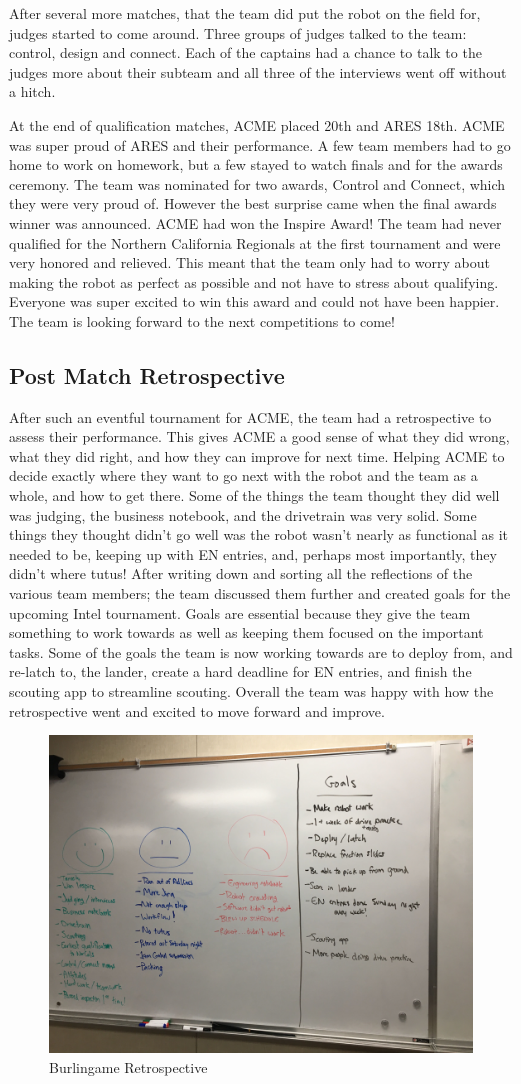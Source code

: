 \documentclass{article}
\begin{document}
After several more matches, that the team did put the robot on the field for, judges started to come around. Three groups of judges talked to the team: control, design and connect. Each of the captains had a chance to talk to the judges more about their subteam and all three of the interviews went off without a hitch. 

At the end of qualification matches, ACME placed 20th and ARES 18th. ACME was super proud of ARES and their performance. A few team members had to go home to work on homework, but a few stayed to watch finals and for the awards ceremony. The team was nominated for two awards, Control and Connect, which they were very proud of. However the best surprise came when the final awards winner was announced. ACME had won the Inspire Award! The team had never qualified for the Northern California Regionals at the first tournament and were very honored and relieved. This meant that the team only had to worry about making the robot as perfect as possible and not have to stress about qualifying. Everyone was super excited to win this award and could not have been happier. The team is looking forward to the next competitions to come!

\subsection{Post Match Retrospective}
After such an eventful tournament for ACME, the team had a retrospective to assess their performance. This gives ACME a good sense of what they did wrong, what they did right, and how they can improve for next time. Helping ACME to decide exactly where they want to go next with the robot and the team as a whole, and how to get there. Some of the things the team thought they did well was judging, the business notebook, and the drivetrain was very solid. Some things they thought didn’t go well was the robot wasn’t nearly as functional as it needed to be, keeping up with EN entries, and, perhaps most importantly, they didn’t where tutus! After writing down and sorting all the reflections of the various team members; the team discussed them further and created goals for the upcoming Intel tournament. Goals are essential because they give the team something to work towards as well as keeping them focused on the important tasks. Some of the goals the team is now working towards are to deploy from, and re-latch to, the lander, create a hard deadline for EN entries, and finish the scouting app to streamline scouting. Overall the team was happy with how the retrospective went and excited to move forward and improve. 

\begin{figure}
    \centering
    \includegraphics[width=.6 \textwidth]{12_11-19/images/retrospective.JPG}
    \caption{Burlingame Retrospective}
    \label{fig:retrospective}
\end{figure}
\end{document}
